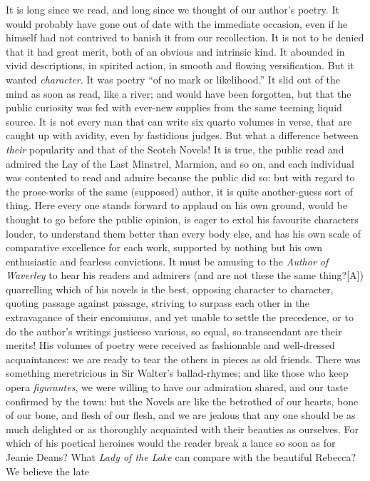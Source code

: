 It is long since we read, and long since we thought of our
author's poetry. It would probably have gone out of date with the
immediate occasion, even if he himself had not contrived to banish
it from our recollection. It is not to be denied that it had great
merit, both of an obvious and intrinsic kind. It abounded in vivid
descriptions, in spirited action, in smooth and flowing
versification. But it wanted \emph{character}. It was poetry ``of no
mark or likelihood.'' It slid out of the mind as soon as read, like
a river; and would have been forgotten, but that the public
curiosity was fed with ever-new supplies from the same teeming
liquid source. It is not every man that can write six quarto
volumes in verse, that are caught up with avidity, even by
fastidious judges. But what a difference between \emph{their}
popularity and that of the Scotch Novels! It is true, the public
read and admired the Lay of the Last Minstrel, Marmion, and so
on, and each individual was contented to read and admire because
the public did so: but with regard to the prose-works of the same
(supposed) author, it is quite another-guess sort of thing. Here
every one stands forward to applaud on his own ground, would be
thought to go before the public opinion, is eager to extol his
favourite characters louder, to understand them better than every
body else, and has his own scale of comparative excellence for
each work, supported by nothing but his own enthusiastic and
fearless convictions. It must be amusing to the \emph{Author of
Waverley} to hear his readers and admirers (and are not these the
same thing?[A]) quarrelling which of his novels is the best,
opposing character to character, quoting passage against passage,
striving to surpass each other in the extravagance of their
encomiums, and yet unable to settle the precedence, or to do the
author's writings justice\textemdash so various, so equal, so transcendant
are their merits! His volumes of poetry were received as
fashionable and well-dressed acquaintances: we are ready to tear
the others in pieces as old friends. There was something
meretricious in Sir Walter's ballad-rhymes; and like those who
keep opera \emph{figurantes}, we were willing to have our admiration
shared, and our taste confirmed by the town: but the Novels are
like the betrothed of our hearts, bone of our bone, and flesh of
our flesh, and we are jealous that any one should be as much
delighted or as thoroughly acquainted with their beauties as
ourselves. For which of his poetical heroines would the reader
break a lance so soon as for Jeanie Deans?  What \emph{Lady of the
Lake} can compare with the beautiful Rebecca? We believe the late
